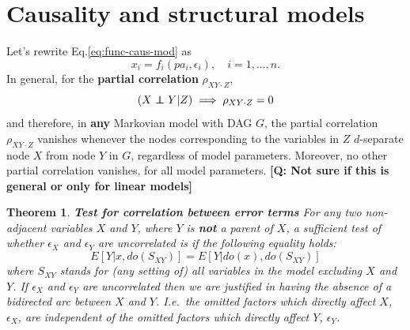 \documentclass[11pt]{article}
\numberwithin{equation}{section}
\newcommand\indep{\protect\mathpalette{\protect\independenT}{\perp}}
\def\independenT#1#2{\mathrel{\rlap{$#1#2$}\mkern2mu{#1#2}}}
\newtheorem{thm}{Theorem}[section]
\begin{document}
\section{Causality and structural models}

Let's rewrite Eq.\eqref{eq:func-caus-mod} as
\begin{equation}
x_i = f_i(pa_i, \epsilon_i), \quad i=1,...,n. 
\end{equation}
In general, for the \textbf{partial correlation} $\rho_{XY\cdot Z}$, 
\begin{equation}
(X \indep Y | Z) \implies \rho_{XY\cdot Z} = 0 
\end{equation}
and therefore, in \textbf{any} Markovian model with DAG $G$, the partial correlation $\rho_{XY\cdot Z}$ vanishes whenever the nodes corresponding to the variables in $Z$ $d$-separate node $X$ from node $Y$ in $G$, regardless of model parameters. Moreover, no other partial correlation vanishes, for all model parameters. \textbf{[Q: Not sure if this is general or only for linear models]}

\begin{thm}
\textbf{Test for correlation between error terms} For any two non-adjacent variables $X$ and $Y$, where $Y$ is \textbf{not} a parent of $X$, a sufficient test of whether $\epsilon_X$ and $\epsilon_Y$ are uncorrelated is if the following equality holds:
\begin{equation}
E[Y|x,do(S_{XY})] = E[Y|do(x),do(S_{XY})] \label{eq:test-corr-error}
\end{equation}
where $S_{XY}$ stands for (any setting of) all variables in the model excluding $X$ and $Y$. If $\epsilon_X$ and $\epsilon_Y$ are uncorrelated then we are justified in having the absence of a bidirected arc between $X$ and $Y$. I.e.\ the omitted factors which directly affect $X$, $\epsilon_X$, are independent of the omitted factors which directly affect $Y$, $\epsilon_Y$.
\end{thm}
\end{document}
